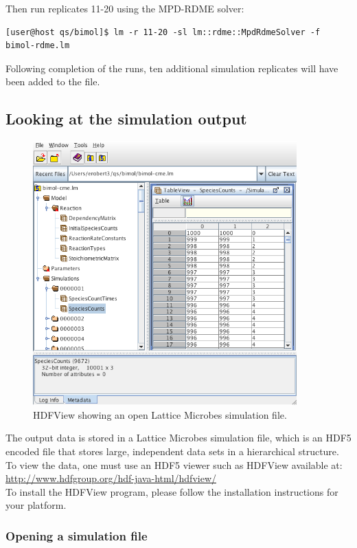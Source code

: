Then run replicates 11-20 using the MPD-RDME solver:
{\small\begin{verbatim}
[user@host qs/bimol]$ lm -r 11-20 -sl lm::rdme::MpdRdmeSolver -f bimol-rdme.lm
\end{verbatim}}

Following completion of the runs, ten additional simulation replicates will have been added to the  file.

\subsection{Looking at the simulation output}

\begin{figure}
\centerline{\includegraphics[width=4in]{Tutorials/HDFViewOpen.png}}
\caption{HDFView showing an open Lattice Microbes simulation file.}
\label{fig:HDFViewOpen}
\end{figure}

The output data is stored in a Lattice Microbes simulation file, which is an HDF5 encoded file that stores large, independent data sets in a hierarchical structure. To view the data, one must use an HDF5 viewer such as HDFView available at:\\
\url{http://www.hdfgroup.org/hdf-java-html/hdfview/}\\

To install the HDFView program, please follow the installation instructions for your platform.

\subsubsection{Opening a simulation file}

